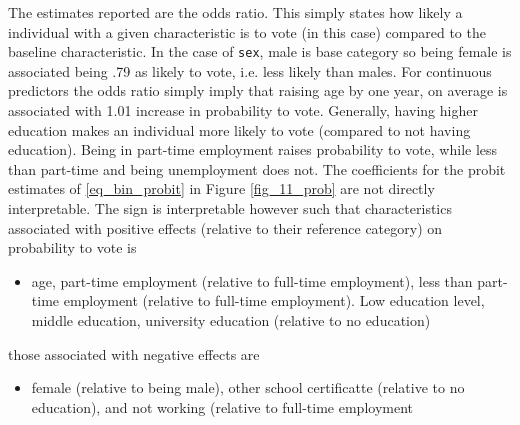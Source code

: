             The estimates reported are the odds ratio. This simply states how likely a individual with a given characteristic is to vote (in this case) compared to the baseline characteristic. In the case of \texttt{sex}, male is base category so being female is associated being .79  as likely to vote, i.e. less likely than males.
                \newline\indent
            For continuous predictors the odds ratio simply imply that raising age by one year, on average is associated with 1.01 increase in probability to vote.
                \newline\indent
            Generally, having higher education makes an individual more likely to vote (compared to not having education). Being in part-time employment raises probability to vote, while less than part-time and being unemployment does not.
                \newline\indent
            The coefficients for the probit estimates of \eqref{eq_bin_probit} in Figure \ref{fig_11_prob} are not directly interpretable. The sign is interpretable however such that characteristics associated with positive effects (relative to their reference category) on probability to vote is
            \begin{itemize}
                \item 
                age, part-time employment (relative to full-time employment), less than part-time employment (relative to full-time employment). Low education level, middle education, university education (relative to no education)
            \end{itemize}
            those associated with negative effects are
            \begin{itemize}
                \item 
                female (relative to being male), other school certificatte (relative to no education), and not working (relative to full-time employment
            \end{itemize}
            
    
